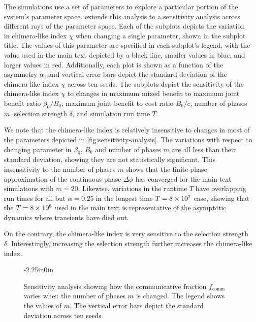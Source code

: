 \documentclass[10pt,letterpaper]{article}
\begin{document}
The simulations use
a set of parameters to explore a particular portion of the
system's parameter space.
 extends this analysis
to a sensitivity analysis across different rays of the parameter space.
Each of the subplots depicts the variation in chimera-like index $\chi$
when changing a single parameter, shown in the subplot title.
The values of this parameter are specified in each subplot's legend,
with the value used in the main text depicted by a black line,
smaller values in blue, and larger values in red.
Additionally, each plot is shown as a function of the asymmetry
$\alpha$,
and vertical error bars depict the standard deviation
of the chimera-like index $\chi$ across ten seeds.
The subplots depict the sensitivity of the chimera-like index $\chi$
to changes in
maximum mixed benefit to maximum joint benefit ratio
$\beta_0/B_0$,
maximum joint benefit to cost ratio $B_0/c$,
number of phases $m$,
selection strength $\delta$,
and
simulation run time $T$.

We note that the chimera-like index is relatively insensitive
to changes in most of the parameters depicted in
\cref{fig:sensitivity-analysis}.
The variations with respect to changing parameter in
$\beta_0$,
$B_0$
and
number of phases $m$
are all less than their standard deviation,
showing they are not statistically significant.
This insensitivity
to the number of phases $m$ shows
that the finite-phase approximation of the continuous phase $\Delta
\phi$
has converged for the main-text simulations with $m=20$.
Likewise,
variations in the
runtime $T$ have overlapping run times for all but
$\alpha = 0.25$ in the longest time $T=\num{8E7}$ case,
showing that the $T = \num{8E6}$ used in the main text
is representative of the asymptotic dynamics
where transients have died out.

On the contrary,
the chimera-like index
is very sensitive to the
selection strength $\delta$.
Interestingly, increasing the selection strength
further increases the chimera-like index.

\begin{figure}
\begin{adjustwidth}{-2.25in}{0in}
  \centering
  \caption{
		Sensitivity analysis showing how the communicative fraction
		$f_{\text{comm}}$
		varies when the number of phases $m$ is changed.
		The legend shows the values of $m$.
		The vertical error bars depict the standard deviation
		across ten seeds.
  }\label{fig:sensitivity-analysis-cumulative}
\end{adjustwidth}
\end{figure}
\end{document}
